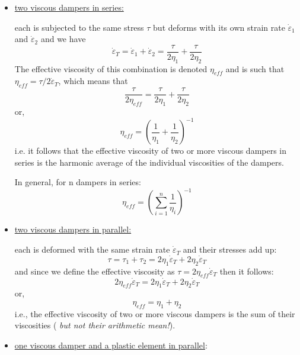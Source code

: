 \begin{itemize}
\item \underline{two viscous dampers in series:} 

\begin{center}

\end{center}

each is subjected to the same stress $\tau$ but deforms 
with its own strain rate $\dot{\varepsilon}_1$ and $\dot{\varepsilon}_2$ and we have 
\begin{equation}
\dot{\varepsilon}_T 
= \dot{\varepsilon}_1 + \dot{\varepsilon}_2
= \frac{\tau}{2\eta_1} + \frac{\tau}{2\eta_2}
\end{equation}
The effective viscosity of this combination is denoted $\eta_{eff}$ and is such that 
$\eta_{eff}=\tau/2\dot{\varepsilon}_T$, which means that 
\[
\frac{\tau}{2\eta_{eff}} = \frac{\tau}{2\eta_1} + \frac{\tau}{2\eta_2}
\]
or, 
\[
\eta_{eff}= \left( \frac{1}{\eta_1} + \frac{1}{\eta_2} \right)^{-1}
\]
i.e. it follows that the effective viscosity of two or more viscous dampers in series is the harmonic 
average of the individual viscosities of the dampers.

In general, for n dampers in series:
\[
\eta_{eff}= \left( \sum_{i=1}^n \frac{1}{\eta_i} \right)^{-1}
\]




\item \underline{two viscous dampers in parallel:}

\begin{center}

\end{center}
 
each is deformed with the same strain rate $\dot{\varepsilon}_T$
and their stresses add up:
\[
\tau = \tau_1 + \tau_2 = 2 \eta_1 \dot{\varepsilon}_T  + 2 \eta_2 \dot{\varepsilon}_T
\]
and since we define the effective viscosity as $\tau = 2 \eta_{eff} \dot{\varepsilon}_T$ then it follows:
\[
2 \eta_{eff} \dot{\varepsilon}_T = 2 \eta_1 \dot{\varepsilon}_T  + 2 \eta_2 \dot{\varepsilon}_T
\]
or, 
\[
\eta_{eff} = \eta_1 + \eta_2 
\]
i.e., the effective viscosity of two or more viscous dampers is the sum of their viscosities ({\sl 
but not their arithmetic mean!}).


\item \underline{one viscous damper and a plastic element in parallel}:
\begin{center}

\end{center}


\end{itemize}
